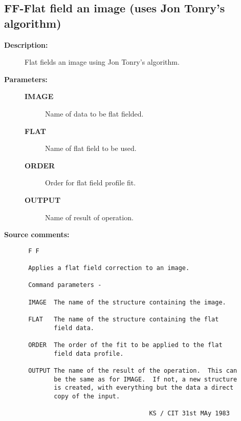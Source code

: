 \subsection{FF-\label{FF}Flat field an image (uses Jon Tonry's algorithm)}
\begin{description}

\item [{\bf Description:}]
 Flat fields an image using Jon Tonry's algorithm.

\item [{\bf Parameters:}]
\begin{description}
\item [{\bf IMAGE}]
 Name of data to be flat fielded.
\item [{\bf FLAT}]
 Name of flat field to be used.
\item [{\bf ORDER}]
 Order for flat field profile fit.
\item [{\bf OUTPUT}]
 Name of result of operation.
\end{description}

\item [{\bf Source comments:}]
\begin{verbatim}
 F F

 Applies a flat field correction to an image.

 Command parameters -

 IMAGE  The name of the structure containing the image.

 FLAT   The name of the structure containing the flat
        field data.

 ORDER  The order of the fit to be applied to the flat
        field data profile.

 OUTPUT The name of the result of the operation.  This can
        be the same as for IMAGE.  If not, a new structure
        is created, with everything but the data a direct
        copy of the input.

                                  KS / CIT 31st MAy 1983
\end{verbatim}
\end{description}
